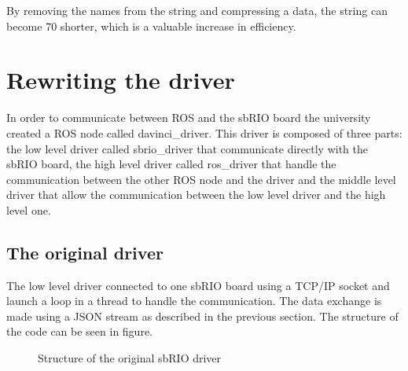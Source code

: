 By removing the names from the string and compressing a data, the string can become 70 shorter, which is a valuable increase in efficiency.



\section{Rewriting the driver}

In order to communicate between ROS and the sbRIO board the university created a ROS node called davinci\_driver. This driver is composed of three parts: the low level driver called sbrio\_driver that communicate directly with the sbRIO board, the high level driver called ros\_driver that handle the communication between the other ROS node and the driver and the middle level driver that allow the communication between the low level driver and the high level one.

\subsection{The original driver}
The low level driver connected to one sbRIO board using a TCP/IP socket and launch a loop in a thread to handle the communication. The data exchange is made using a JSON stream as described in the previous section. The structure of the code can be seen in figure.

\begin{figure}[H]
\centering
{}
\caption{Structure of the original sbRIO driver}
\label{original_driver}
\end{figure}

